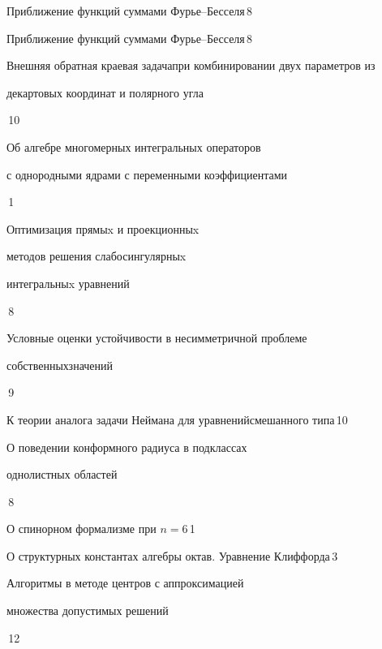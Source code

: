 

{Приближение функций суммами Фурье--Бесселя}{\No\,8}




{Приближение функций суммами Фурье--Бесселя}{\No\,8}




{Внешняя обратная краевая задача\newline при комбинировании двух параметров из


декартовых координат и полярного угла}{\No\,10}




{Об алгебре многомерных интегральных операторов\newline


с однородными ядрами с переменными коэффициентами}{\No\,1}




{Оптимизация прямыx и проекционныx 


методов решения слабосингулярныx\newline


интегральныx уравнений}{\No\,8}




{Условные оценки устойчивости в несимметричной проблеме


собственных\newline значений}{\No\,9}




{К теории аналога задачи Неймана для уравнений\newline смешанного типа}{\No\,10}




{О поведении конформного радиуса в подклассах\newline


однолистных областей}{\No\,8}




{О спинорном формализме при $n=6$}{\No\,1}




{О структурных константах алгебры октав. Уравнение Клиффорда}{\No\,3}




{Алгоритмы в методе центров с аппроксимацией\newline


множества допустимых решений}{\No\,12}


